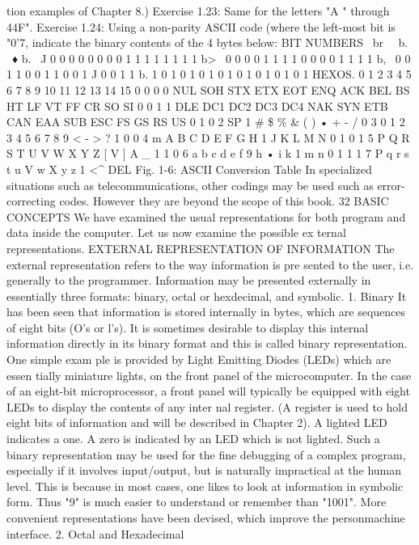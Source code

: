 \documentclass{book}
\begin{document}
tion examples of Chapter 8.)
Exercise 1.23: Same for the letters "A " through 44F".
Exercise 1.24: Using a non-parity ASCII code (where the left-most
bit is "0'7, indicate the binary contents of the 4 bytes below:
BIT NUMBERS
\
br
\
\
b.
\
♦
b.
\ J
0
0
0
0
0
0
0
0
1
1
1
1
1
1
1
1
b>
\
0
0
0
0
1
1
1
1
0
0
0
0
1
1
1
1
b,
\
0
0
1
1
0
0
1
1
0
0
1
J
0
0
1
1
b.
1
0
1
0
1
0
1
0
1
0
1
0
1
0
1
0
1
HEXOS.
0
1
2
3
4
5
6
7
8
9
10
11
12
13
14
15
0
0
0
0
NUL
SOH
STX
ETX
EOT
ENQ
ACK
BEL
BS
HT
LF
VT
FF
CR
SO
SI
0
0
1
1
DLE
DC1
DC2
DC3
DC4
NAK
SYN
ETB
CAN
EAA
SUB
ESC
FS
GS
RS
US
0
1
0
2
SP
1
#
\$
\%
\&
(
)
•
+
-
/
0
3
0
1
2
3
4
5
6
7
8
9
<
-
>
?
1
0
0
4
m
A
B
C
D
E
F
G
H
1
J
K
L
M
N
0
1
0
1
5
P
Q
R
S
T
U
V
W
X
Y
Z
[
V
]
A
_
1
1
0
6
a
b
c
d
e
f
9
h
•
i
k
1
m
n
0
1
1
1
7
P
q
r
s
t
u
V
w
X
y
z
{
1
}
<^
DEL
Fig. 1-6: ASCII Conversion Table
In specialized situations such as telecommunications, other
codings may be used such as error-correcting codes. However they
are beyond the scope of this book.
32
BASIC CONCEPTS
We have examined the usual representations for both program
and data inside the computer. Let us now examine the possible ex
ternal representations.
EXTERNAL REPRESENTATION OF INFORMATION
The external representation refers to the way information is pre
sented to the user, i.e. generally to the programmer. Information
may be presented externally in essentially three formats: binary,
octal or hexdecimal, and symbolic.
1. Binary
It has been seen that information is stored internally in bytes,
which are sequences of eight bits (O's or l's). It is sometimes
desirable to display this internal information directly in its binary
format and this is called binary representation. One simple exam
ple is provided by Light Emitting Diodes (LEDs) which are essen
tially miniature lights, on the front panel of the microcomputer. In
the case of an eight-bit microprocessor, a front panel will typically
be equipped with eight LEDs to display the contents of any inter
nal register. (A register is used to hold eight bits of information
and will be described in Chapter 2). A lighted LED indicates a one.
A zero is indicated by an LED which is not lighted. Such a binary
representation may be used for the fine debugging of a complex
program, especially if it involves input/output, but is naturally
impractical at the human level. This is because in most cases, one
likes to look at information in symbolic form. Thus "9" is much
easier to understand or remember than "1001". More convenient
representations have been devised, which improve the personmachine
interface.
2. Octal and Hexadecimal
\end{document}
